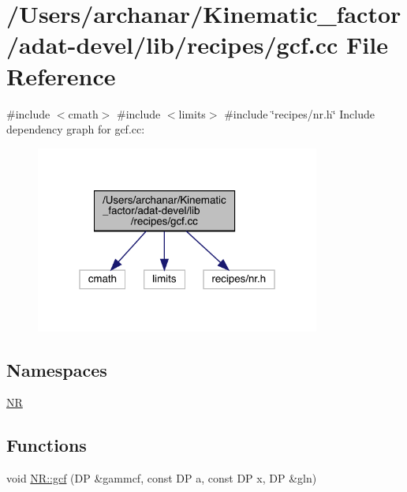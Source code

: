 \hypertarget{adat-devel_2lib_2recipes_2gcf_8cc}{}\section{/\+Users/archanar/\+Kinematic\+\_\+factor/adat-\/devel/lib/recipes/gcf.cc File Reference}
\label{adat-devel_2lib_2recipes_2gcf_8cc}
{\ttfamily \#include $<$cmath$>$}\newline
{\ttfamily \#include $<$limits$>$}\newline
{\ttfamily \#include \char`\"{}recipes/nr.\+h\char`\"{}}\newline
Include dependency graph for gcf.\+cc\+:
\nopagebreak
\begin{figure}[H]
\begin{center}
\leavevmode
\includegraphics[width=265pt]{d4/d27/adat-devel_2lib_2recipes_2gcf_8cc__incl}
\end{center}
\end{figure}
\subsection*{Namespaces}
\begin{DoxyCompactItemize}
\item 
 \mbox{\hyperlink{namespaceNR}{NR}}
\end{DoxyCompactItemize}
\subsection*{Functions}
\begin{DoxyCompactItemize}
\item 
void \mbox{\hyperlink{namespaceNR_a54a09ab3536295080e52c4deb5cc42c5}{N\+R\+::gcf}} (DP \&gammcf, const DP a, const DP x, DP \&gln)
\end{DoxyCompactItemize}
